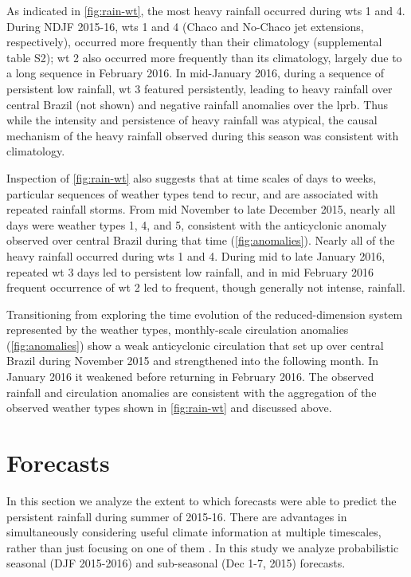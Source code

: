\documentclass{ametsoc}
\begin{document}
As indicated in \cref{fig:rain-wt}, the most heavy rainfall occurred during \glspl{wt} 1 and 4.
During NDJF 2015-16, \glspl{wt} 1 and 4 (Chaco and No-Chaco jet extensions, respectively),  occurred more frequently than their climatology (supplemental table S2); \gls{wt} 2 also occurred more frequently than its climatology, largely due to a long sequence in February 2016.
In mid-January 2016, during a sequence of persistent low rainfall, \gls{wt} 3 featured persistently, leading to heavy rainfall over central Brazil (not shown) and negative rainfall anomalies over the \gls{lprb}.
Thus while the intensity and persistence of heavy rainfall was atypical, the causal mechanism of the heavy rainfall observed during this season was consistent with climatology.

Inspection of \cref{fig:rain-wt} also suggests that at time scales of days to weeks, particular sequences of weather types tend to recur, and are associated with repeated rainfall storms.
From mid November to late December 2015, nearly all days were weather types 1, 4, and 5, consistent with the anticyclonic anomaly observed over central Brazil during that time (\cref{fig:anomalies}).
Nearly all of the heavy rainfall occurred during \glspl{wt} 1 and 4.
During mid to late January 2016, repeated \gls{wt} 3 days led to persistent low rainfall, and in mid February 2016 frequent occurrence of \gls{wt} 2 led to frequent, though generally not intense, rainfall.

Transitioning from exploring the time evolution of the reduced-dimension system represented by the weather types, monthly-scale circulation anomalies (\cref{fig:anomalies}) show a weak anticyclonic circulation that set up over central Brazil during November 2015 and strengthened into the following month.
In January 2016 it weakened before returning in February 2016.
The observed rainfall and circulation anomalies are consistent with the aggregation of the observed weather types shown in \cref{fig:rain-wt} and discussed above.


\section{Forecasts}\label{sec:fcsts}

In this section we analyze the extent to which forecasts were able to predict the persistent rainfall during summer of 2015-16.
There are advantages in simultaneously considering useful climate information at multiple timescales, rather than just focusing on one of them \citep{Hellmuth2011,Goddard2014}.
In this study we analyze probabilistic seasonal (DJF 2015-2016) and sub-seasonal (Dec 1-7, 2015) forecasts.
\end{document}
